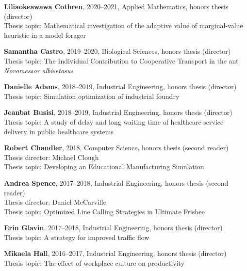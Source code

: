 \documentclass[10pt]{article}           %
\begin{document}
\begin{outerlist}
    \item \textbf{Liliaokeawawa Cothren}, 2020--2021, Applied Mathematics, honors thesis (director)\\
        Thesis topic: Mathematical investigation of the adaptive value of marginal-value heuristic in a model forager

    \item \textbf{Samantha Castro}, 2019--2020, Biological Sciences, honors thesis (director)\\
        Thesis topic: The Individual Contribution to Cooperative Transport in the ant \emph{Novomessor albisetosus}

    \item \textbf{Danielle Adams}, 2018--2019, Industrial Engineering, honors thesis (director)\\
        Thesis topic: Simulation optimization of industrial foundry

    \item \textbf{Jeanbat Busisi}, 2018--2019, Industrial Engineering, honors thesis (director)\\
        Thesis topic: A study of delay and long waiting time of healthcare service delivery in public healthcare systems

    \item \textbf{Robert Chandler}, 2018, Computer Science, honors thesis (second reader)
        Thesis director: Michael Clough\\
        Thesis topic: Developing an Educational Manufacturing Simulation

    \item \textbf{Andrea Spence}, 2017--2018, Industrial Engineering, honors thesis (second reader)\\
        Thesis director: Daniel McCarville\\
        Thesis topic: Optimized Line Calling Strategies in Ultimate Frisbee

    \item \textbf{Erin Glavin}, 2017--2018, Industrial Engineering, honors thesis (director)\\
        Thesis topic: A strategy for improved traffic flow

    \item \textbf{Mikaela Hall}, 2016--2017, Industrial Engineering, honors thesis (director)\\
        Thesis topic: The effect of workplace culture on productivity


\end{outerlist}
\end{document}

